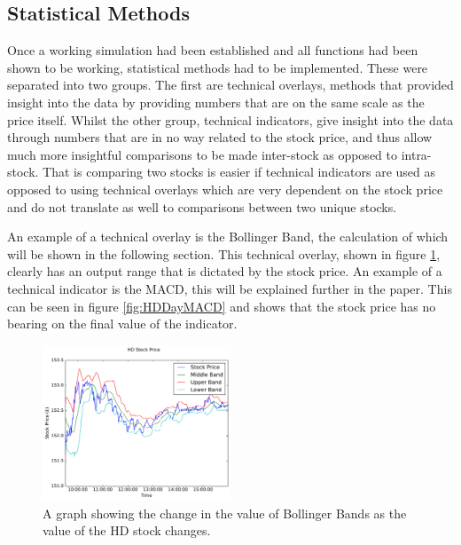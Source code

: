\documentclass[conference]{IEEEtran}
\begin{document}

\subsection{Statistical Methods}

Once a working simulation had been established and all functions had been shown to be working, statistical methods had to be implemented. These were separated into two groups. The first are technical overlays, methods that provided insight into the data by providing numbers that are on the same scale as the price itself. Whilst the other group, technical indicators, give insight into the data through numbers that are in no way related to the stock price, and thus allow much more insightful comparisons to be made inter-stock as opposed to intra-stock. That is comparing two stocks is easier if technical indicators are used as opposed to using technical overlays which are very dependent on the stock price and do not translate as well to comparisons between two unique stocks. 

An example of a technical overlay is the Bollinger Band, the calculation of which will be shown in the following section. This technical overlay, shown in figure \ref{fig:HDDayBollinger}, clearly has an output range that is dictated by the stock price. An example of a technical indicator is the MACD, this will be explained further in the paper. This can be seen in figure \ref{fig:HDDayMACD} and shows that the stock price has no bearing on the final value of the indicator.

\begin{figure}
\includegraphics[width=0.5\textwidth, angle=0]{HDDayBollinger.pdf}
\caption{A graph showing the change in the value of Bollinger Bands as the value of the HD stock changes.}
\label{fig:HDDayBollinger}
\end{figure}
\end{document}

